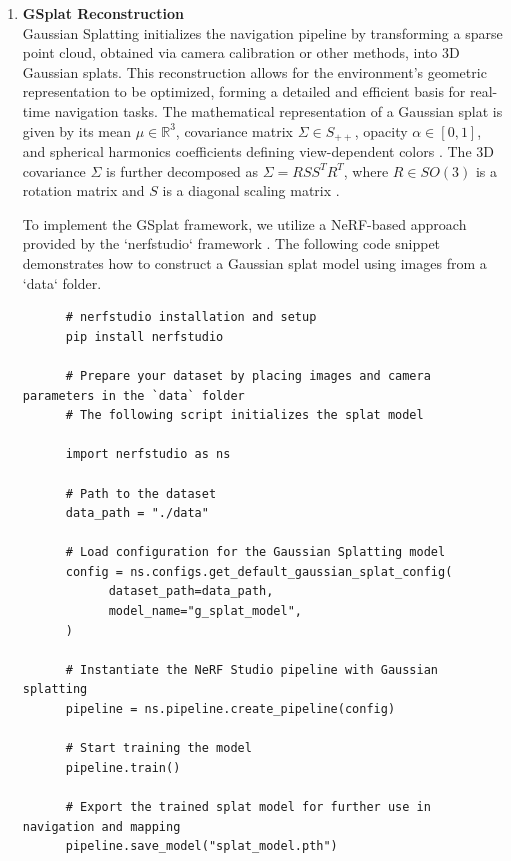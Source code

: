 \begin{enumerate}
      \item \textbf{GSplat Reconstruction} \\
            Gaussian Splatting initializes the navigation pipeline by transforming a sparse point cloud, obtained via camera calibration or other methods, into 3D Gaussian splats. This reconstruction allows for the environment's geometric representation to be optimized, forming a detailed and efficient basis for real-time navigation tasks. The mathematical representation of a Gaussian splat is given by its mean $\mu \in \mathbb{R}^3$, covariance matrix $\Sigma \in S_{++}$, opacity $\alpha \in [0,1]$, and spherical harmonics coefficients defining view-dependent colors \cite{kerbl20233dgaussiansplattingrealtime}.
            The 3D covariance $\Sigma$ is further decomposed as $\Sigma = R S S^T R^T$, where $R \in SO(3)$ is a rotation matrix and $S$ is a diagonal scaling matrix \cite{chen2024splatnavsaferealtimerobot}.

            To implement the GSplat framework, we utilize a NeRF-based \cite{zhang2024visuallocalization3dmaps} approach provided by
            the `nerfstudio` framework \cite{Tancik_2023}. The following code snippet demonstrates how to
            construct a Gaussian splat model using images from a `data` folder.

            \begin{lstlisting}
      # nerfstudio installation and setup
      pip install nerfstudio
      
      # Prepare your dataset by placing images and camera parameters in the `data` folder
      # The following script initializes the splat model
      
      import nerfstudio as ns
      
      # Path to the dataset
      data_path = "./data"
      
      # Load configuration for the Gaussian Splatting model
      config = ns.configs.get_default_gaussian_splat_config(
            dataset_path=data_path,
            model_name="g_splat_model",
      )
      
      # Instantiate the NeRF Studio pipeline with Gaussian splatting
      pipeline = ns.pipeline.create_pipeline(config)
      
      # Start training the model
      pipeline.train()
      
      # Export the trained splat model for further use in navigation and mapping
      pipeline.save_model("splat_model.pth")
\end{lstlisting}


\end{enumerate}
